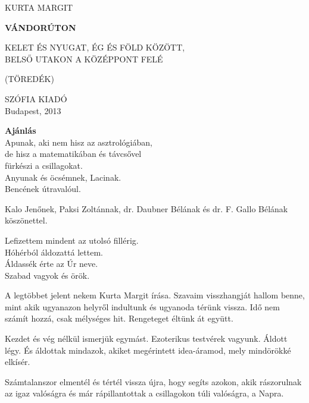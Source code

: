 
\clearpage
\begin{center}
KURTA MARGIT

\bigskip
{\Large\textbf{VÁNDORÚTON}}

\medskip
KELET ÉS NYUGAT, ÉG ÉS FÖLD KÖZÖTT,	\\
BELSŐ UTAKON A KÖZÉPPONT FELÉ

(TÖREDÉK)

\vfill
SZÓFIA KIADÓ \\
Budapest, 2013
\end{center}

\clearpage
\otherfamily

\begin{vplace}
\begin{flushright}
\textbf{Ajánlás}					\\
Apunak, aki nem hisz az asztrológiában,			\\
de hisz a matematikában és távcsővel			\\
fürkészi a csillagokat.					\\
Anyunak és öcsémnek, Lacinak.				\\
Bencének útravalóul.

\bigskip
Kalo Jenőnek, Paksi Zoltánnak, dr. Daubner Bélának
és dr. F. Gallo Bélának köszönettel.
\end{flushright}
\end{vplace}

\clearpage

\begin{flushleft}
Lefizettem mindent az utolsó fillérig.	\\
Hóhérból áldozattá lettem.		\\
Áldassék érte az Úr neve.		\\
Szabad vagyok és örök.
\end{flushleft}

\vfill\noindent
A legtöbbet jelent nekem Kurta Margit írása. Szavaim visszhangját
hallom benne, mint akik ugyanazon helyről indultunk és ugyanoda
térünk vissza. Idő nem számít hozzá, csak mélységes hit. Rengeteget
éltünk át együtt.

Kezdet és vég nélkül ismerjük egymást. Ezoterikus testvérek vagyunk.
Áldott légy. És áldottak mindazok, akiket megérintett idea-áramod,
mely mindörökké elkísér.

Számtalanszor elmentél és tértél vissza újra, hogy segíts azokon,
akik rászorulnak az igaz valóságra és már rápillantottak a csillagokon
túli valóságra, a Napra.

